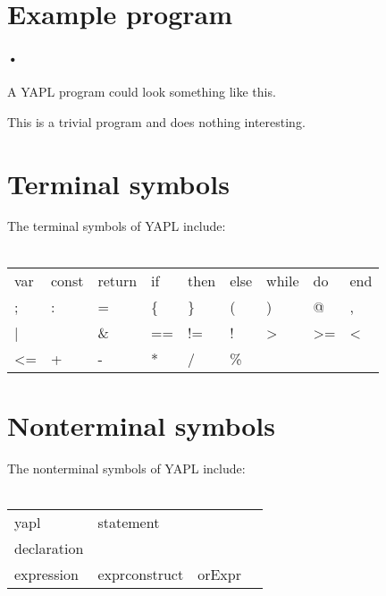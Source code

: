\setlength{\grammarparsep}{10pt plus 1pt minus 1pt} %
\setlength{\grammarindent}{12em} %
\section{Example program}

\paragraph{•}
A YAPL program could look something like this.


This is a trivial program and does nothing interesting. 
\section{Terminal symbols}
The terminal symbols of YAPL include:\\\\
\begin{tabular}{lllllllll}
var	&	const	&	return	&	if	&	then		&	else		&	while	&	do	&	end \\
;	&	: 	& 	= 	& 	\{ 	& 	\} 	& 	( 	& 	) 	& 	@ 	& 	, 	\\ 
| 	& 	\	&	\& 	& 	== 	& 	!= 	& 	! 	& 	> 	& 	>=	& 	< 	\\
<=	&	+ 	& 	- 	& 	* 	& 	/ 	& 	\% 	\\
\end{tabular}

\section{Nonterminal symbols}
The nonterminal symbols of YAPL include:\\\\
\begin{tabular}{llll}
yapl			&	statement		&			&		\\
declaration	&					&			&		\\
expression	&	exprconstruct	&	orExpr	&		\\

\end{tabular}

